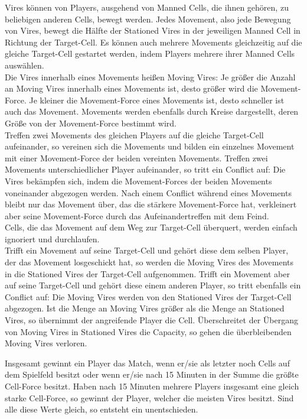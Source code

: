 Vires können von Players, ausgehend von Manned Cells, die ihnen gehören, zu beliebigen anderen Cells, bewegt werden. 
Jedes Movement, also jede Bewegung von Vires, bewegt die Hälfte der Stationed Vires in der jeweiligen Manned Cell in Richtung der Target-Cell.
Es können auch mehrere Movements gleichzeitig auf die gleiche Target-Cell gestartet werden, indem Players mehrere ihrer Manned Cells auswählen. \\
Die Vires innerhalb eines Movements heißen Moving Vires: Je größer die Anzahl an Moving Vires innerhalb eines Movements ist, desto größer wird die Movement-Force.
Je kleiner die Movement-Force eines Movements ist, desto schneller ist auch das Movement.
Movements werden ebenfalls durch Kreise dargestellt, deren Größe von der Movement-Force bestimmt wird. \\
Treffen zwei Movements des gleichen Players auf die gleiche Target-Cell aufeinander, so vereinen sich die Movements und bilden ein einzelnes Movement mit einer Movement-Force der beiden vereinten Movements.
Treffen zwei Movements unterschiedlicher Player aufeinander, so tritt ein Conflict auf: Die Vires bekämpfen sich, indem die Movement-Forces der beiden Movements voneinander abgezogen werden. Nach einem Conflict während eines Movements bleibt nur das Movement über, das die stärkere Movement-Force hat, verkleinert aber seine Movement-Force durch das Aufeinandertreffen mit dem Feind. \\
Cells, die das Movement auf dem Weg zur Target-Cell überquert, werden einfach ignoriert und durchlaufen. \\
Trifft ein Movement auf seine Target-Cell und gehört diese dem selben Player, der das Movement losgeschickt hat, so werden die Moving Vires des Movements in die Stationed Vires der Target-Cell aufgenommen.
Trifft ein Movement aber auf seine Target-Cell und gehört diese einem anderen Player, so tritt ebenfalls ein Conflict auf: Die Moving Vires werden von den Stationed Vires der Target-Cell abgezogen. Ist die Menge an Moving Vires größer als die Menge an Stationed Vires, so übernimmt der angreifende Player die Cell.
Überschreitet der Übergang von Moving Vires in Stationed Vires die Capacity, so gehen die überbleibenden Moving Vires verloren.

Insgesamt gewinnt ein Player das Match, wenn er/sie als letzter noch Cells auf dem Spielfeld besitzt oder wenn er/sie nach 15 Minuten in der Summe die größte Cell-Force besitzt. Haben nach 15 Minuten mehrere Players insgesamt eine gleich starke Cell-Force, so gewinnt der Player, welcher die meisten Vires besitzt. Sind alle diese Werte gleich, so entsteht ein unentschieden.

